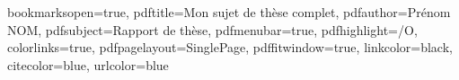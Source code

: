 \usepackage{color}

\hypersetup
{
bookmarksopen=true,
pdftitle={Mon sujet de thèse complet},
pdfauthor={Prénom NOM},
pdfsubject={Rapport de thèse},
pdfmenubar=true,
pdfhighlight=/O,
colorlinks=true,
pdfpagelayout=SinglePage,
pdffitwindow=true,
linkcolor=black,
citecolor=blue,
urlcolor=blue
}



\usepackage{fancyhdr}
\pagestyle{fancy}
\fancyfoot{}
\fancyhead[LE,RO]{\bfseries\thepage}
\fancyhead[RE]{\bfseries\nouppercase{\leftmark}}
\fancyhead[LO]{\bfseries\nouppercase{\rightmark}}

\let\headruleORIG\headrule
\renewcommand{\headrule}{\color{black} \headruleORIG}
\renewcommand{\headrulewidth}{1.0pt}
\usepackage{colortbl}
\usepackage{epstopdf}
\fancypagestyle{plain}{
  \fancyhead{}
  \fancyfoot[C]{\thepage}
  \renewcommand{\headrulewidth}{0pt}
}

\usepackage[footnote]{acronym}

\usepackage[nottoc, notlof, notlot]{tocbibind}
\usepackage[english]{minitoc}
\setcounter{minitocdepth}{2}
\mtcindent=15pt
\setlength{\parskip}{10pt}

\let\minitocORIG\minitoc
\renewcommand{\minitoc}{\minitocORIG \vspace{1.5em}}

\setcounter{secnumdepth}{3}
\setcounter{tocdepth}{2}
\usepackage{silence}



%

\makeatletter
\def\cleardoublepage{\clearpage\if@twoside \ifodd\c@page\else%
  \hbox{}%
  \thispagestyle{empty}%
  \newpage%
  \if@twocolumn\hbox{}\newpage\fi\fi\fi}
\makeatother

\newenvironment{vcenterpage}
{\newpage\vspace*{\fill}\thispagestyle{empty}\renewcommand{\headrulewidth}{0pt}}
{\vspace*{\fill}}

